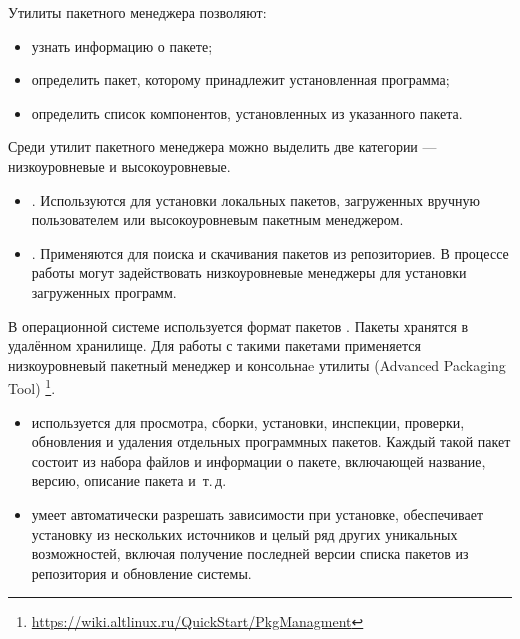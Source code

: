 Утилиты пакетного менеджера позволяют:

\begin{itemize}
	\item узнать информацию о пакете;
	\item определить пакет, которому принадлежит установленная программа;
	\item определить список компонентов, установленных из указанного пакета.
\end{itemize}

Среди утилит пакетного менеджера можно выделить две категории --- низкоуровневые и высокоуровневые.

\begin{itemize}
	\item {}. Используются для установки
	локальных пакетов, загруженных вручную пользователем или высокоуровневым пакетным менеджером.
	\item {}. Применяются для поиска и скачивания пакетов из репозиториев.
	В процессе работы могут задействовать низкоуровневые менеджеры для установки загруженных программ.
\end{itemize}

В операционной системе  используется формат пакетов .
Пакеты  хранятся в удалённом хранилище.
Для работы с такими пакетами применяется низкоуровневый пакетный менеджер 
и консольнаe утилиты  (Advanced Packaging Tool)%
\footnote{\href{https://wiki.altlinux.ru/QuickStart/PkgManagment\#\%D0\%9E\%D1\%81\%D0\%BD\%D0\%BE\%D0\%B2\%D0\%BD\%D1\%8B\%D0\%B5_\%D0\%B8\%D0\%BD\%D1\%81\%D1\%82\%D1\%80\%D1\%83\%D0\%BC\%D0\%B5\%D0\%BD\%D1\%82\%D1\%8B_\%D0\%B4\%D0\%BB\%D1\%8F_\%D1\%83\%D0\%BF\%D1\%80\%D0\%B0\%D0\%B2\%D0\%BB\%D0\%B5\%D0\%BD\%D0\%B8\%D1\%8F_\%D0\%BF\%D0\%B0\%D0\%BA\%D0\%B5\%D1\%82\%D0\%B0\%D0\%BC\%D0\%B8}{https://wiki.altlinux.ru/QuickStart/PkgManagment}}.

\begin{itemize}
	\item {} используется для просмотра, сборки, установки, инспекции,
		проверки, обновления и удаления отдельных программных пакетов. Каждый такой пакет состоит
		из набора файлов и информации о пакете, включающей название, версию, описание пакета и~т.\,д.
	\item {} умеет автоматически
		разрешать зависимости при установке, обеспечивает установку из нескольких источников и целый
		ряд других уникальных возможностей, включая получение последней версии списка пакетов из
		репозитория и обновление системы.
\end{itemize}

